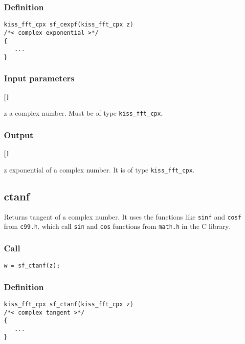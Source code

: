 \subsubsection*{Definition}
\begin{verbatim}
kiss_fft_cpx sf_cexpf(kiss_fft_cpx z)
/*< complex exponential >*/
{
   ...
}
\end{verbatim}

\subsubsection*{Input parameters}
\begin{desclist}{\tt }{\quad}[\tt ]
   \setlength\itemsep{0pt}
   \item[z] a complex number. Must be of type \texttt{kiss\_fft\_cpx}.
\end{desclist}

\subsubsection*{Output}
\begin{desclist}{\tt }{\quad}[\tt ]
   \setlength\itemsep{0pt}
   \item[z] exponential of a complex number. It is of type \texttt{kiss\_fft\_cpx}.
\end{desclist}




\subsection{{ctanf}}
Returns tangent of a complex number. It uses the functions like \texttt{sinf} and \texttt{cosf} from \texttt{c99.h}, which call \texttt{sin} and \texttt{cos} functions from \texttt{math.h} in the C library.

\subsubsection*{Call}
\begin{verbatim}w = sf_ctanf(z);\end{verbatim}

\subsubsection*{Definition}
\begin{verbatim}
kiss_fft_cpx sf_ctanf(kiss_fft_cpx z)
/*< complex tangent >*/
{
   ...
}
\end{verbatim}

